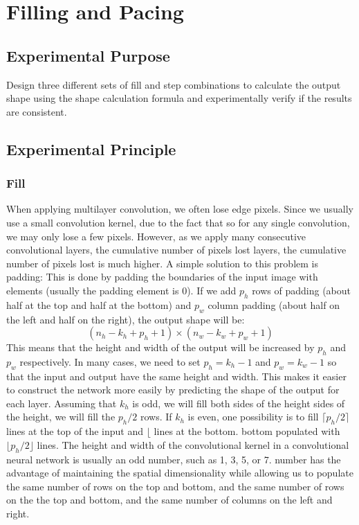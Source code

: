 \documentclass[a4paper,12pt]{article}
\begin{document}
\justifying

\newpage
\section{Filling and Pacing}
\subsection{Experimental Purpose}
Design three different sets of fill and step combinations to calculate the output shape using the shape calculation formula and experimentally verify if the results are consistent.

\subsection{Experimental Principle}
\subsubsection{Fill}
When applying multilayer convolution, we often lose edge pixels. Since we usually use a small convolution kernel, due to the fact that
so for any single convolution, we may only lose a few pixels. However, as we apply many consecutive convolutional layers, the cumulative number of pixels lost
layers, the cumulative number of pixels lost is much higher. A simple solution to this problem is padding:
This is done by padding the boundaries of the input image with elements (usually the padding element is 0). If we add $p_h$ rows of padding (about
half at the top and half at the bottom) and $p_w$ column padding (about half on the left and half on the right), the output shape
will be:
\begin{equation}
(n_h - k_h + p_h + 1) \times (n_w - k_w + p_w + 1)
\end{equation}
This means that the height and width of the output will be increased by $p_h $ and $p_w$ respectively. In many cases, we need to set
$p_h = k_h - 1$ and $p_w = k_w - 1$ so that the input and output have the same height and width. This makes it easier to construct the
network more easily by predicting the shape of the output for each layer. Assuming that $k_h$ is odd, we will fill both sides of the height
sides of the height, we will fill the $p_h/2$ rows. If $k_h$ is even, one possibility is to fill $\lceil p_h/2 \rceil$ lines at the top of the input and $\lfloor$ lines at the bottom.
bottom populated with $\lfloor p_h/2 \rfloor$ lines.
The height and width of the convolutional kernel in a convolutional neural network is usually an odd number, such as 1, 3, 5, or 7.
number has the advantage of maintaining the spatial dimensionality while allowing us to populate the same number of rows on the top and bottom, and the same number of rows on the
the top and bottom, and the same number of columns on the left and right.
\end{document}
